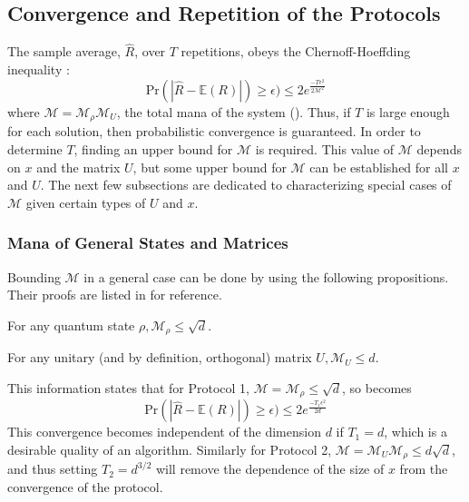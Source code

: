 \documentclass[../3Wworkreport.tex]{subfiles}
\begin{document}
\subsection{Convergence and Repetition of the Protocols}
\label{subsec:convergence_repetitions}
The sample average, $\hat{R}$, over $T$ repetitions, obeys the Chernoff-Hoeffding inequality \parencite{Pashayan2014}:
\begin{equation}
	\text{Pr}(|\hat{R} - \mathbb{E}(R)|) \ge \epsilon) \le 2e^{\frac{-T\epsilon^2}{2\mathcal{M}^2}} \label{eq:chernoff}
\end{equation}
where $\mathcal{M} = \mathcal{M}_\rho\mathcal{M}_U$, the total mana of the system (). Thus, if $T$ is large enough for each solution, then probabilistic convergence is guaranteed. In order to determine $T$, finding an upper bound for $\mathcal{M}$ is required. This value of $\mathcal{M}$ depends on $x$ and the matrix $U$, but some upper bound for $\mathcal{M}$ can be established for all $x$ and $U$. The next few subsections are dedicated to characterizing special cases of $\mathcal{M}$ given certain types of $U$ and $x$.

\subsubsection{Mana of General States and Matrices}
\label{subsubsec:cr_general}
Bounding $\mathcal{M}$ in a general case can be done by using the following propositions. Their proofs are listed in  for reference.
\begin{prop}\label{prop:manarho}
	For any quantum state $\rho, \mathcal{M}_\rho \le \sqrt{d}$.
\end{prop}
\begin{prop}\label{prop:manaunitary}
	For any unitary (and by definition, orthogonal) matrix $U, \mathcal{M}_U \le d$.
\end{prop}
This information states that for Protocol 1, $\mathcal{M} = \mathcal{M}_\rho \le \sqrt{d}$, so  becomes
\begin{equation}
	\text{Pr}(|\hat{R} - \mathbb{E}(R)|) \ge \epsilon) \le 2e^{\frac{-T_1\epsilon^2}{2d}}
\end{equation}
This convergence becomes independent of the dimension $d$ if $T_1 = d$, which is a desirable quality of an algorithm. Similarly for Protocol 2, $\mathcal{M} = \mathcal{M}_U \mathcal{M}_\rho \le d\sqrt{d}$, and thus setting $T_2 = d^{3/2}$ will remove the dependence of the size of $x$ from the convergence of the protocol.
\end{document}
